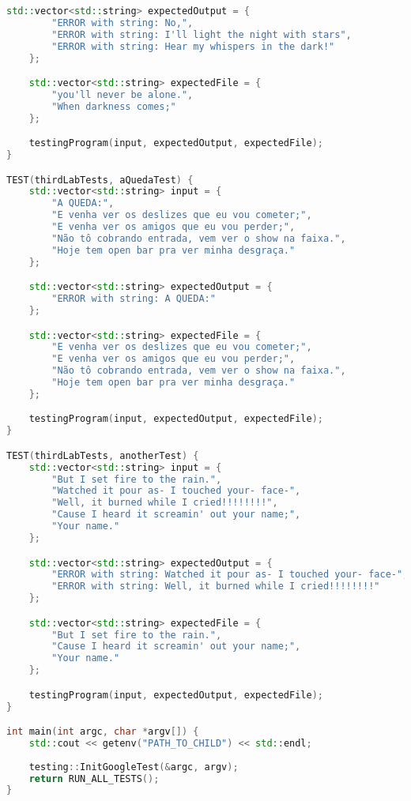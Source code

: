 \documentclass[a4paper, 12pt]{article}
\begin{document}
\begin{lstlisting}[language=C++]
    std::vector<std::string> expectedOutput = {
        "ERROR with string: No,",
        "ERROR with string: I'll light the night with stars",
        "ERROR with string: Hear my whispers in the dark!"
    };

    std::vector<std::string> expectedFile = {
        "you'll never be alone.",
        "When darkness comes;"
    };

    testingProgram(input, expectedOutput, expectedFile);
}

TEST(thirdLabTests, aQuedaTest) {
    std::vector<std::string> input = {
        "A QUEDA:",
        "E venha ver os deslizes que eu vou cometer;",
        "E venha ver os amigos que eu vou perder;",
        "Não tô cobrando entrada, vem ver o show na faixa.",
        "Hoje tem open bar pra ver minha desgraça."
    };

    std::vector<std::string> expectedOutput = {
        "ERROR with string: A QUEDA:"
    };

    std::vector<std::string> expectedFile = {
        "E venha ver os deslizes que eu vou cometer;",
        "E venha ver os amigos que eu vou perder;",
        "Não tô cobrando entrada, vem ver o show na faixa.",
        "Hoje tem open bar pra ver minha desgraça."
    };

    testingProgram(input, expectedOutput, expectedFile);
}

TEST(thirdLabTests, anotherTest) {
    std::vector<std::string> input = {
        "But I set fire to the rain.",
        "Watched it pour as- I touched your- face-",
        "Well, it burned while I cried!!!!!!!!",
        "Cause I heard it screamin' out your name;",
        "Your name."
    };

    std::vector<std::string> expectedOutput = {
        "ERROR with string: Watched it pour as- I touched your- face-",
        "ERROR with string: Well, it burned while I cried!!!!!!!!"
    };

    std::vector<std::string> expectedFile = {
        "But I set fire to the rain.",
        "Cause I heard it screamin' out your name;",
        "Your name."
    };    

    testingProgram(input, expectedOutput, expectedFile);
}

int main(int argc, char *argv[]) {
    std::cout << getenv("PATH_TO_CHILD") << std::endl;
    
    testing::InitGoogleTest(&argc, argv);
    return RUN_ALL_TESTS();
}
\end{lstlisting}
\newpage
\end{document}
